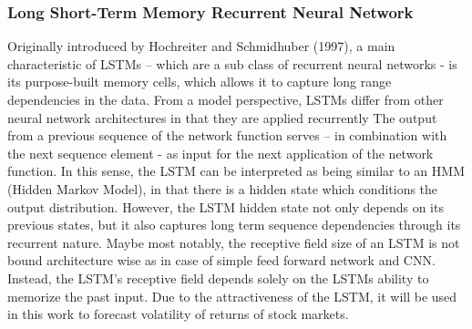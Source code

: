 \documentclass[a4paper,11pt,oneside]{book}
\begin{document}
\subsubsection{Long Short-Term Memory Recurrent Neural Network}
Originally introduced by Hochreiter and Schmidhuber (1997), a main characteristic of LSTMs – which are a sub class of recurrent neural networks - is its purpose-built memory cells, which allows it to capture long range dependencies in the data. From a model perspective, LSTMs differ from other neural network architectures in that they are applied recurrently\newline\newline
The output from a previous sequence of the network function serves – in combination with the next sequence element - as input for the next application of the network function. In this sense, the LSTM can be interpreted as being similar to an HMM (Hidden Markov Model), in that there is a hidden state which conditions the output distribution. However, the LSTM hidden state not only depends on its previous states, but it also captures long term sequence dependencies through its recurrent nature. Maybe most notably, the receptive field size of an LSTM is not bound architecture wise as in case of simple feed forward network and CNN. Instead, the LSTM’s receptive field depends solely on the LSTMs ability to memorize the past input. Due to the attractiveness of the LSTM, it will be used in this work to forecast volatility of returns of stock markets. \newline\newline
\end{document}
